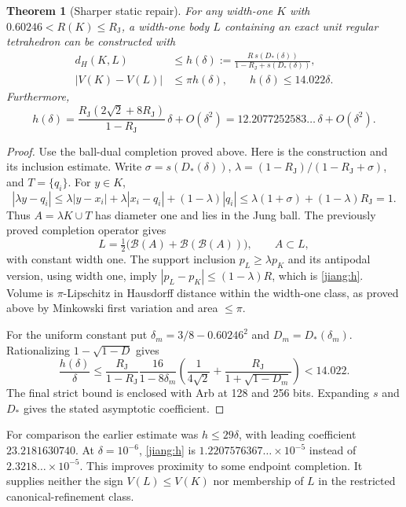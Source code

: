 \documentclass[11pt]{article}
\newtheorem{theorem}{Theorem}[section]
\theoremstyle{remark}\newtheorem{remark}[theorem]{Remark}
\newcommand{\RJ}{R_{\mathrm J}}
\newcommand{\B}{\mathcal B}
\begin{document}
\begin{theorem}[Sharper static repair]\label{jiang:repair}
For any width-one $K$ with $0.60246<R(K)\leq\RJ$, a width-one body $L$
containing an exact unit regular tetrahedron can be constructed with
\begin{align}
 d_H(K,L)&\leq h(\delta):=
 \frac{R\,s(D_*(\delta))}{1-\RJ+s(D_*(\delta))},\label{jiang:h}\\
 |V(K)-V(L)|&\leq\pi h(\delta),\qquad h(\delta)\leq14.022\delta.
\end{align}
Furthermore,
\[
 h(\delta)=
 \frac{\RJ(2\sqrt2+8\RJ)}{1-\RJ}\,\delta+O(\delta^2)
 =12.2077252583\ldots\,\delta+O(\delta^2).
\]
\end{theorem}
\begin{proof}
Use the ball-dual completion proved above. Here is the construction and its inclusion estimate.
Write $\sigma=s(D_*(\delta))$, $\lambda=(1-\RJ)/(1-\RJ+\sigma)$,
and $T=\{q_i\}$. For $y\in K$,
\[
 |\lambda y-q_i|\leq\lambda|y-x_i|+
       \lambda|x_i-q_i|+(1-\lambda)|q_i|
 \leq\lambda(1+\sigma)+(1-\lambda)\RJ=1.
\]
Thus $A=\lambda K\cup T$ has diameter one and lies in the Jung ball.
The previously proved completion operator gives
\[
 L=\tfrac12\bigl(\B(A)+\B(\B(A))\bigr),\qquad A\subset L,
\]
with constant width one. The support inclusion $p_L\geq\lambda p_K$
and its antipodal version, using width one, imply
$|p_L-p_K|\leq(1-\lambda)R$, which is \eqref{jiang:h}.
Volume is $\pi$-Lipschitz in Hausdorff distance within the width-one class,
as proved above by Minkowski first variation and area $\leq\pi$.

For the uniform constant put $\delta_m=3/8-0.60246^2$ and
$D_m=D_*(\delta_m)$. Rationalizing $1-\sqrt{1-D}$ gives
\[
 \frac{h(\delta)}{\delta}\leq
 \frac{\RJ}{1-\RJ}\frac{16}{1-8\delta_m}
 \left(\frac1{4\sqrt2}+\frac{\RJ}{1+\sqrt{1-D_m}}\right)
 <14.022.
\]
The final strict bound is enclosed with Arb at 128 and 256 bits.
Expanding $s$ and $D_*$ gives the stated asymptotic coefficient.
\end{proof}

For comparison the earlier estimate was $h\leq29\delta$, with leading
coefficient $23.2181630740$. At $\delta=10^{-6}$, \eqref{jiang:h} is
$1.2207576367\ldots\times10^{-5}$ instead of
$2.3218\ldots\times10^{-5}$. This improves proximity to some endpoint
completion. It supplies neither the sign $V(L)\leq V(K)$ nor membership
of $L$ in the restricted canonical-refinement class.
\end{document}

